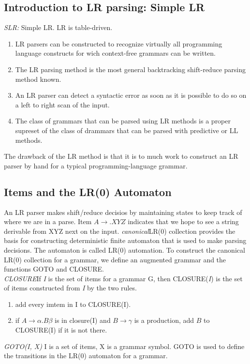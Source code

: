 \subsection{Introduction to LR parsing: Simple LR}
\emph{SLR:} Simple LR. LR is table-driven. 
\begin{enumerate}
	\item{LR parsers can be constructed to recognize virtually all programming language constructs for wich context-free grammars can be written. }
	\item{The LR parsing method is the most general backtracking shift-reduce parsing method known.}
	\item{An LR parser can detect a syntactic error as soon as it is possible to do so on a left to right scan of the input. }
	\item{The class of grammars that can be parsed using LR methods is a proper supreset of the class of drammars that can be parsed with predictive or LL methods.}
\end{enumerate}
The drawback of the LR method is that it is to much work to construct an LR parser by hand for a typical programming-language grammar.

\subsection{Items and the LR(0) Automaton}
An LR parser makes shift/reduce decisios by maintaining states to keep track of where we are in a parse. Item $A \rightarrow .XYZ$ indicates that we hope to see a string derivable from XYZ next on the input. \emph{canonical}LR(0) collection provides the basis for constructing deterministic finite automaton that is used to make parsing decisions. The automaton is called LR(0) automation. To construct the canonical LR(0) collection for a grammar, we define an augmented grammar and the functions GOTO and CLOSURE. \\\emph{CLOSURE}If \emph{I} is the set of items for a grammar G, then CLOSURE(\emph{I}) is the set of items constructed from \emph{I} by the two rules.
\begin{enumerate}
	\item{add every imtem in I to CLOSURE(I).}
	\item{if $A \rightarrow \alpha . B \beta$ is in closure(I) and $B \rightarrow \gamma$ is a production, add $B$ to CLOSURE(I) if it is not there.}
\end{enumerate}

\emph{GOTO(I, X)} I is a set of items, X is a grammar symbol. GOTO is used to define the transitions in the LR(0) automaton for a grammar.  \\

